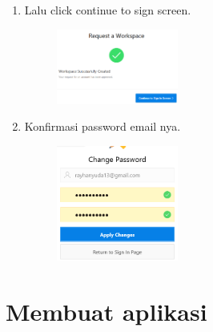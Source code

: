 \documentclass[a4paper,12pt]{report}
\begin{document}
\begin{enumerate}
\item 
Lalu click continue to sign screen.
\begin{figure}[h]
\includegraphics[width=4cm]{gambar/10.png}
\end{figure}

\item
Konfirmasi password email nya.
\begin{figure}[h]
\includegraphics[width=4cm]{gambar/11.png}
\end{figure} 

\end{enumerate}

\chapter*{Membuat aplikasi}
\end{document}
